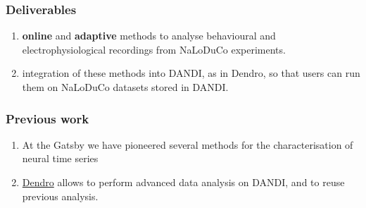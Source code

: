 
\begin{frame}
    \frametitle{Deliverables}

    \begin{enumerate}

        \item \textbf{online} and \textbf{adaptive} methods to analyse
            behavioural and electrophysiological recordings from NaLoDuCo
            experiments.

        \item integration of these methods into DANDI, as in Dendro, so that users
        can run them on NaLoDuCo datasets stored in DANDI.

    \end{enumerate}

\end{frame}

\begin{frame}
    \frametitle{Previous work}

    \begin{enumerate}

		\item At the Gatsby we have pioneered several methods for the
		characterisation of neural time
		series~\citep[e.g.,][]{yuEtAl09,dunckerAndSahani18,ruttenEtAl20,yuEtAl24,buesingEtAl12a,buesingEtAl12b,mackeEtAl15,soulatEtAl21,walkerEtAl23,turnerAndSahani14,osheaEtAl22,pachitariuEtAl13a,pachitariuEtAl13b}

        \item \href{https://github.com/magland/dendro}{Dendro} allows to
            perform advanced data analysis on DANDI, and to reuse previous
            analysis.

    \end{enumerate}

\end{frame}

